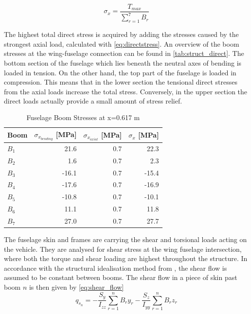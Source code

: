   \begin{equation}
     \label{eq:directstress}
     \sigma _{x} = \frac{T_{max}}{\sum_{r=1}^{7} B_{r}}
 \end{equation}


The highest total direct stress is acquired by adding the stresses caused by the strongest axial load, calculated with \autoref{eq:directstress}. An overview of the boom stresses at the wing-fuselage connection can be found in \autoref{tab:struct_direct}. The bottom section of the fuselage which lies beneath the neutral axes of bending is loaded in tension. On the other hand, the top part of the fuselage is loaded in compression. This means that in the lower section the tensional direct stresses from the axial loads increase the total stress. Conversely, in the upper section the direct loads actually provide a small amount of stress relief.





\begin{table}[htbp]
  \centering
  \caption{Fuselage Boom Stresses at x=0.617 m}
    \begin{tabular}{lrrr}
    \toprule
    \bfseries Boom      &\bfseries $\sigma_{x_{bending}}$ [MPa]&\bfseries $\sigma_{x_{axial}}$ [MPa]    &\bfseries $\sigma_{x}$ [MPa] \\
    \midrule
    $B_{1}$  &  21.6 &  0.7  & 22.3  \\
    $B_{2}$  & 1.6 &  0.7  & 2.3 \\
    $B_{3}$  & -16.1 & 0.7   & -15.4 \\
    $B_{4}$  &  -17.6 & 0.7   & -16.9 \\
    $B_{5}$  & -10.8 & 0.7   & -10.1 \\
    $B_{6}$  & 11.1 &   0.7 & 11.8 \\
    $B_{7}$  & 27.0&  0.7  &  27.7\\
    \bottomrule
    \end{tabular}%
  \label{tab:struct_direct}%
\end{table}%

 
The fuselage skin and frames are carrying the shear and torsional loads acting on the vehicle. They are analysed for shear stress at the wing fuselage intersection, where both the torque and shear loading are highest throughout the structure. In accordance with the structural idealisation method from \cite{megson}, the shear flow is assumed to be constant between booms. The shear flow in a piece of skin past boom $n$ is then given by \autoref{eq:shear_flow}
\begin{equation}
\label{eq:shear_flow}
q_{s_{n}} = - \frac{S_{y}}{I_{zz}}    \sum_{r=1}^{n} B_{r}y_{r} - \frac{S_{z}}{I_{yy}} \sum_{r=1}^{n} B_{r}z_{r} 
\end{equation}

